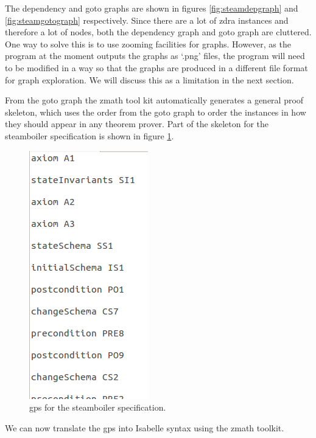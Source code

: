 The dependency and goto graphs are shown in figures \ref{fig:steamdepgraph} and
\ref{fig:steamgotograph} respectively. Since there are a lot of \gls{zdra}
instances and therefore a lot of nodes, both the dependency graph and goto graph
are cluttered. One way to solve this is to use zooming facilities for graphs.
However, as the program at the moment outputs the graphs as `.png' files, the
program will need to be modified in a way so that the graphs are produced in a 
different file format for graph exploration.
 We will discuss this as a limitation in the next section.

From the goto graph the \gls{zmath} tool kit automatically generates a general
proof skeleton, which uses the order from the goto graph to order the instances
in how they should appear in any theorem prover. Part of the skeleton for the
steamboiler specification is shown in figure \ref{fig:steamgpsa}.

\begin{figure}[H]
\includegraphics[scale=0.5]{Figures/Evaluation/steamboilergpsa.png}
\caption{\Gls{gps} for the steamboiler specification. \label{fig:steamgpsa}}
\end{figure}

We can now translate the \gls{gps} into Isabelle syntax using the \gls{zmath}
toolkit.

